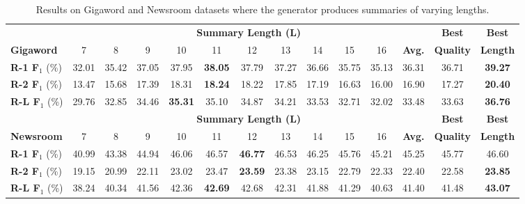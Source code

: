 \documentclass[11pt]{article}
\begin{document}
\begin{table*}[t]
\setlength{\tabcolsep}{6pt}
\renewcommand{\arraystretch}{1.2}
\centering
\begin{fontpbk}
\begin{scriptsize}
\begin{tabular}{|l|ccccccccccc|c|c|}
\hline
& \multicolumn{11}{c|}{\textbf{Summary Length (L)}} & \textbf{Best} & \textbf{Best} \\
\textbf{Gigaword} & 7 & 8 & 9 & 10 & 11 & 12 & 13 & 14 & 15 & 16 & \textbf{Avg.} & \textbf{Quality} & \textbf{Length}\\
\hdashline
\textbf{R-1 F$_1$} (\%) & 32.01 & 35.42 & 37.05 & 37.95 & \textbf{38.05} & 37.79 & 37.27 & 36.66 & 35.75 & 35.13 & 36.31 & 36.71 & \textbf{39.27}\\
\textbf{R-2 F$_1$} (\%) & 13.47 & 15.68 & 17.39 & 18.31 & \textbf{18.24} & 18.22 & 17.85 & 17.19 & 16.63 & 16.00 & 16.90 & 17.27 & \textbf{20.40}\\
\textbf{R-L F$_1$} (\%) & 29.76 & 32.85 & 34.46 & \textbf{35.31} & 35.10 & 34.87 & 34.21 & 33.53 & 32.71 & 32.02 & 33.48 & 33.63 & \textbf{36.76}\\
\hline
\hline
& \multicolumn{11}{c|}{\textbf{Summary Length (L)}} & \textbf{Best} & \textbf{Best} \\
\textbf{Newsroom} & 7 & 8 & 9 & 10 & 11 & 12 & 13 & 14 & 15 & 16 & \textbf{Avg.} & \textbf{Quality} & \textbf{Length}\\
\hdashline
\textbf{R-1 F$_1$} (\%) & 40.99 & 43.38 & 44.94 & 46.06 & 46.57 & \textbf{46.77} & 46.53 & 46.25 & 45.76 & 45.21 & 45.25 & 45.77 & 46.60\\
\textbf{R-2 F$_1$} (\%) & 19.15 & 20.99 & 22.11 & 23.02 & 23.47 & \textbf{23.59} & 23.38 & 23.15 & 22.79 & 22.33 & 22.40 & 22.58 & \textbf{23.85}\\
\textbf{R-L F$_1$} (\%) & 38.24 & 40.34 & 41.56 & 42.36 & \textbf{42.69} & 42.68 & 42.31 & 41.88 & 41.29 & 40.63 & 41.40 & 41.48 & \textbf{43.07}\\
\hline
\end{tabular}
\end{scriptsize}
\end{fontpbk}
\vspace{-0.05in}
\caption{Results on Gigaword and Newsroom datasets where the generator produces summaries of varying lengths.
}
\label{tab:results_varying_lengths}
\vspace{-0.15in}
\end{table*}
\end{document}
